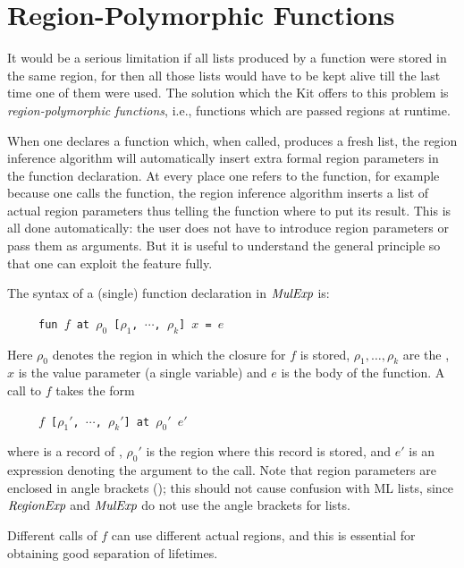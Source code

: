 \documentclass[12pt]{book}
\begin{document}
\section{Region-Polymorphic Functions}
It would be a serious limitation if 
all lists produced by a function were stored
in the same region, for then all those lists would have to be kept
alive till the last time one of them were used. The solution which the Kit
offers to this problem is {\em region-polymorphic functions}, i.e., functions
which are passed regions at runtime. 

When one declares a function which, when called, produces
a fresh list, the region inference algorithm will automatically insert extra
formal region parameters in the function declaration.
At every place one refers to the function, for example because one calls the function,
the region inference algorithm inserts
a list of actual region parameters thus telling the function where to put its
result. This is all done automatically: the user does not have to introduce
region parameters or pass them as arguments. But it is useful to understand
the general principle so that one can exploit the feature fully.

The syntax of a (single) function declaration in $\hbox{\it MulExp}$ is:
\begin{tabbing}
\ \ \ \ \ \=\tt fun $f$ at $\rho_0$ [$\rho_1$, $\cdots$, $\rho_k$] $x$ = $e$
\end{tabbing}
Here $\rho_0$ denotes the region in which the closure for $f$ is stored,
$\rho_1, \ldots,\rho_k$ are 
the , $x$ is the
value parameter (a single variable) and $e$ is the body of the function.
A call to $f$ takes the form
\begin{tabbing}
\ \ \ \ \ \=\tt $f$  [$\rho_1'$, $\cdots$, $\rho_k'$] at $\rho_0'$ $e'$
\end{tabbing}
where  is a record of ,
$\rho_0'$ is the region where this record is stored, and $e'$ is an expression
denoting the argument to the call. Note that region parameters are enclosed in angle brackets
(\boxml{[ ]}); this should not cause confusion with ML lists, since $\hbox{\it RegionExp}$ and $\hbox{\it MulExp}$
do not use the angle brackets for lists.

Different calls of $f$ can use different actual regions,
and this is essential for obtaining good separation of lifetimes.
\end{document}
